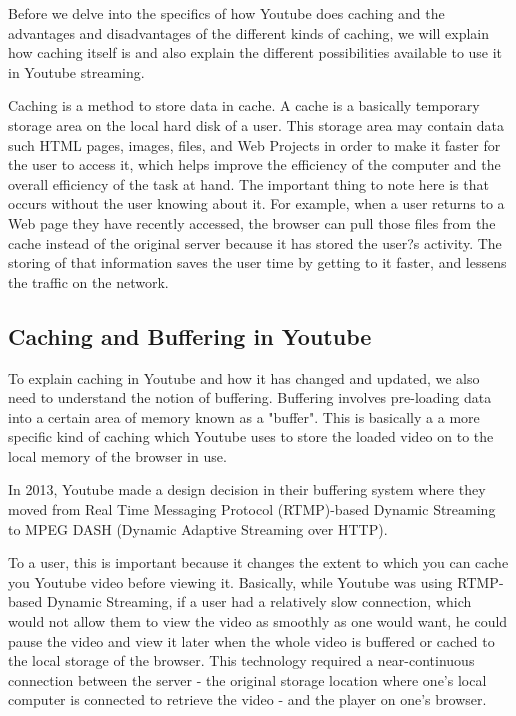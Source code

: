 Before we delve into the specifics of how Youtube does caching and the advantages and disadvantages of the different kinds of caching, we will explain how caching itself is and also explain the different possibilities available to use it in Youtube streaming.

Caching is a method to store data in cache. A cache is a basically temporary storage area on the local hard disk of a user. This storage area may contain data such HTML pages, images, files, and Web Projects in order to make it faster for the user to access it, which helps improve the efficiency of the computer and the overall efficiency of the task at hand. The important thing to note here is that occurs without the user knowing about it. For example, when a user returns to a Web page they have recently accessed, the browser can pull those files from the cache instead of the original server because it has stored the user?s activity. The storing of that information saves the user time by getting to it faster, and lessens the traffic on the network.


\subsection{Caching and Buffering in Youtube}
To explain caching in Youtube and how it has changed and updated, we also need to understand the notion of buffering. Buffering involves pre-loading data into a certain area of memory known as a "buffer". This is basically a a more specific kind of caching which Youtube uses to store the loaded video on to the local memory of the browser in use.

In 2013, Youtube made a design decision in their buffering system where they moved from Real Time Messaging Protocol (RTMP)-based Dynamic Streaming to MPEG DASH (Dynamic Adaptive Streaming over HTTP).

To a user, this is important because it changes the extent to which you can cache you Youtube video before viewing it. Basically, while Youtube was using RTMP-based Dynamic Streaming, if a user had a relatively slow connection, which would not allow them to view the video as smoothly as one would want, he could pause the video and view it later when the whole video is buffered or cached to the local storage of the browser. This technology required a near-continuous connection between the server - the original storage location where one's local computer is connected to retrieve the video - and the player on one's browser.

